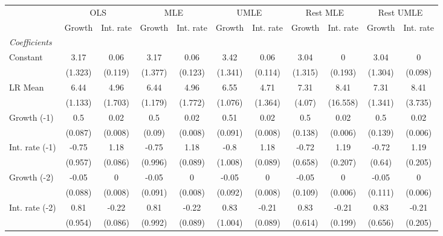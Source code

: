\begin{table}[htbp] 
	\centering
	\begin{tabular}{@{\extracolsep{4pt}}lcccccccccc@{}}		\hline\hline
		 		 & \multicolumn{2}{c}{OLS} &\multicolumn{2}{c}{MLE} &\multicolumn{2}{c}{UMLE} &\multicolumn{2}{c}{Rest MLE} &\multicolumn{2}{c}{Rest UMLE} \\ 
 		 & Growth 	 & Int. rate 	 & Growth 	 & Int. rate 	 & Growth 	 & Int. rate 	 & Growth 	 & Int. rate 	 & Growth 	 & Int. rate\\\cline{2-3}\cline{4-5}\cline{6-7}\cline{8-9}\cline{10-11}
\rule{0pt}{4ex} 
 \emph{Coefficients} 	  		 & 		 & 		 & 		 & 		 & 		 & 		 & 		 & 		 & 		 &\\ 
\quad Constant 	 & 3.17 	 & 0.06 	 & 3.17 	 & 0.06 	 & 3.42 	 & 0.06 	 & 3.04 	 & 0 	 & 3.04 	 & 0	 \\ 
 		 & (1.323) 	 & (0.119) 	 & (1.377) 	 & (0.123) 	 & (1.341) 	 & (0.114) 	 & (1.315) 	 & (0.193) 	 & (1.304) 	 & (0.098) 	 \\ 
\quad LR Mean 	 & 6.44 	 & 4.96 	 & 6.44 	 & 4.96 	 & 6.55 	 & 4.71 	 & 7.31 	 & 8.41 	 & 7.31 	 & 8.41	 \\ 
 		 & (1.133) 	 & (1.703) 	 & (1.179) 	 & (1.772) 	 & (1.076) 	 & (1.364) 	 & (4.07) 	 & (16.558) 	 & (1.341) 	 & (3.735) 	 \\ 
\quad Growth (-1) 	 &0.5 	 & 0.02 	 & 0.5 	 & 0.02 	 & 0.51 	 & 0.02 	 & 0.5 	 & 0.02 	 & 0.5 	 & 0.02	 \\ 
 		 & (0.087) 	 & (0.008) 	 & (0.09) 	 & (0.008) 	 & (0.091) 	 & (0.008) 	 & (0.138) 	 & (0.006) 	 & (0.139) 	 & (0.006) 	 \\ 
\quad Int. rate (-1) 	 &-0.75 	 & 1.18 	 & -0.75 	 & 1.18 	 & -0.8 	 & 1.18 	 & -0.72 	 & 1.19 	 & -0.72 	 & 1.19	 \\ 
 		 & (0.957) 	 & (0.086) 	 & (0.996) 	 & (0.089) 	 & (1.008) 	 & (0.089) 	 & (0.658) 	 & (0.207) 	 & (0.64) 	 & (0.205) 	 \\ 
\quad Growth (-2) 	 &-0.05 	 & 0 	 & -0.05 	 & 0 	 & -0.05 	 & 0 	 & -0.05 	 & 0 	 & -0.05 	 & 0	 \\ 
 		 & (0.088) 	 & (0.008) 	 & (0.091) 	 & (0.008) 	 & (0.092) 	 & (0.008) 	 & (0.109) 	 & (0.006) 	 & (0.111) 	 & (0.006) 	 \\ 
\quad Int. rate (-2) 	 &0.81 	 & -0.22 	 & 0.81 	 & -0.22 	 & 0.83 	 & -0.21 	 & 0.83 	 & -0.21 	 & 0.83 	 & -0.21	 \\ 
 		 & (0.954) 	 & (0.086) 	 & (0.992) 	 & (0.089) 	 & (1.004) 	 & (0.089) 	 & (0.614) 	 & (0.199) 	 & (0.656) 	 & (0.205) 	 \\ 

\end{tabular}
\end{table}
